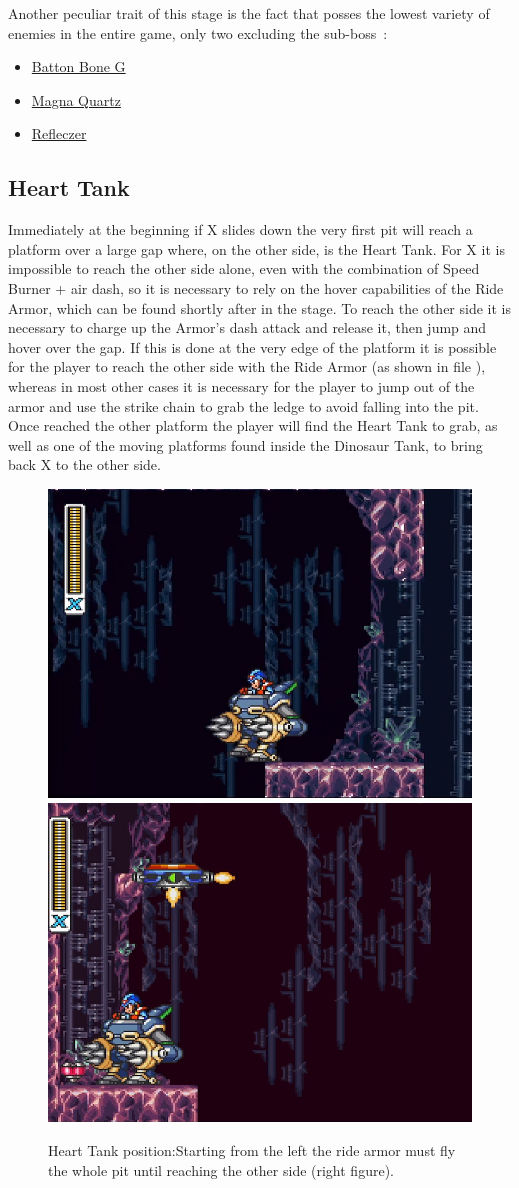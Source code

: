 Another peculiar trait of this stage is the fact that posses the lowest variety of enemies in the entire game, only two excluding the sub-boss~\cite{wiki:Energen_mine}:
\begin{itemize}
	\item \hyperlink {enem:Batton_Bone_type_G}{Batton Bone G}
	\item \hyperlink {miniboss:Magna_Quartz}{Magna Quartz}
	\item \hyperlink {enem:Refleczer}{Refleczer}
\end{itemize}

\subsection{Heart Tank}
Immediately at the beginning if X slides down the very first pit will reach a platform over a large gap where, on the other side, is the Heart Tank. For X it is impossible to reach the other side alone, even with the combination of Speed Burner + air dash, so it is necessary to rely on the hover capabilities of the Ride Armor, which can be found shortly after in the stage. To reach the other side it is necessary to charge up the Armor's dash attack and release it, then jump and hover over the gap. If this is done at the very edge of the platform it is possible for the player to reach the other side with the Ride Armor (as shown in file ), whereas in most other cases it is necessary for the player to jump out of the armor and  use the strike chain to grab the ledge to avoid falling into the pit. Once reached the other platform the player will find the Heart Tank to grab, as well as one of the moving platforms found inside the Dinosaur Tank, to bring back X to the other side.
\begin{figure}[htp]
	\centering
	\includegraphics[width=0.45\linewidth]{figures/X2/Crystal_snail/Crystal_heart_starting_spot.png}
	\includegraphics[width=0.45\linewidth]{figures/X2/Crystal_snail/Crystal_heart.png}
	\caption{Heart Tank position:Starting from the left the ride armor must fly the whole pit until reaching the other side (right figure).}
\end{figure}

